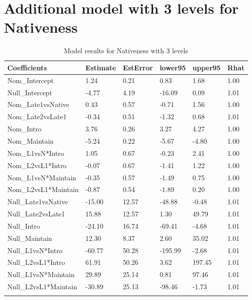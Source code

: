 \documentclass[]{elsarticle} %
\begin{document}
\clearpage

\hypertarget{additional-model-with-3-levels-for-nativeness}{%
\section{Additional model with 3 levels for
Nativeness}\label{additional-model-with-3-levels-for-nativeness}}

\label{section:d}

\begin{table}[hbt!]

\begin{center}
\begin{threeparttable}

\caption{\label{tab:unnamed-chunk-5}Model results for Nativeness with 3 levels}

\small{

\begin{tabular}{llllll}
\toprule
Coefficients & \multicolumn{1}{c}{Estimate} & \multicolumn{1}{c}{EstError} & \multicolumn{1}{c}{lower95} & \multicolumn{1}{c}{upper95} & \multicolumn{1}{c}{Rhat}\\
\midrule
Nom\_Intercept & 1.24 & 0.21 & 0.83 & 1.68 & 1.00\\
Null\_Intercept & -4.77 & 4.19 & -16.09 & 0.09 & 1.01\\
Nom\_Late1vsNative & 0.43 & 0.57 & -0.71 & 1.56 & 1.00\\
Nom\_Late2vsLate1 & -0.34 & 0.51 & -1.32 & 0.68 & 1.01\\
Nom\_Intro & 3.76 & 0.26 & 3.27 & 4.27 & 1.00\\
Nom\_Maintain & -5.24 & 0.22 & -5.67 & -4.80 & 1.00\\
Nom\_L1vsN*Intro & 1.05 & 0.67 & -0.23 & 2.41 & 1.00\\
Nom\_L2vsL1*Intro & -0.07 & 0.67 & -1.41 & 1.22 & 1.00\\
Nom\_L1vsN*Maintain & -0.35 & 0.57 & -1.49 & 0.75 & 1.00\\
Nom\_L2vsL1*Maintain & -0.87 & 0.54 & -1.89 & 0.20 & 1.00\\
Null\_Late1vsNative & -15.00 & 12.57 & -48.88 & -0.48 & 1.01\\
Null\_Late2vsLate1 & 15.88 & 12.57 & 1.30 & 49.79 & 1.01\\
Null\_Intro & -24.10 & 16.74 & -69.41 & -4.68 & 1.01\\
Null\_Maintain & 12.30 & 8.37 & 2.60 & 35.02 & 1.01\\
Null\_L1vsN*Intro & -60.77 & 50.28 & -195.99 & -2.68 & 1.01\\
Null\_L2vsL1*Intro & 61.91 & 50.26 & 3.62 & 197.45 & 1.01\\
Null\_L1vsN*Maintain & 29.89 & 25.14 & 0.81 & 97.46 & 1.01\\
Null\_L2vsL1*Maintain & -30.89 & 25.13 & -98.46 & -1.73 & 1.01\\
\bottomrule
\addlinespace
\end{tabular}

}
\end{threeparttable}
\end{center}
\end{table}
\end{document}
